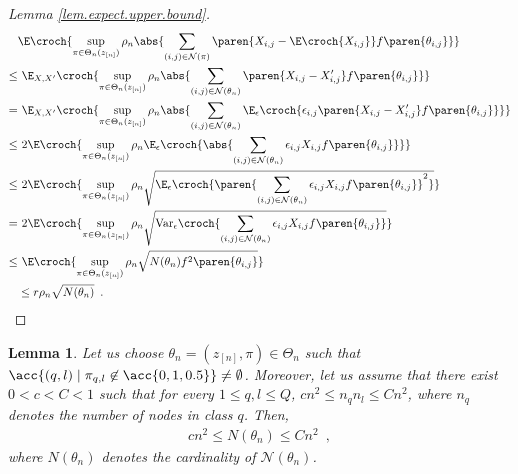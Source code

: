 \documentclass[11pt]{article}
\newtheorem{proof}{Proof}%
\newtheorem{lem}[thm]{Lemma}
\newcommand{\zn}{z_{[n]}}
\begin{document}
\begin{proof}[Lemma \ref{lem.expect.upper.bound}]
                \begin{align*}
& \E\croch{\sup_{\pi\in\Theta_n(\zn)}\rho_n\abs{\sum_{(i,j)\in\mathcal{N}(\pi)}\paren{X_{i,j}-\E\croch{X_{i,j}}}f\paren{\theta_{i,j}}}} \\
\leq &
\ \E_{X,X'}\croch{\sup_{\pi\in\Theta_n(\zn)} \rho_n \abs{\sum_{(i,j)\in\mathcal{N}(\theta_n)}\paren{X_{i,j}-X'_{i,j}}f\paren{\theta_{i,j}}}}\\
 = & \  \E_{X,X'}\croch{\sup_{\pi\in\Theta_n(\zn)} \rho_n \abs{\sum_{(i,j)\in\mathcal{N}(\theta_n)}\E_{\epsilon}\croch{\epsilon_{i,j}\paren{X_{i,j}-X'_{i,j}}f\paren{\theta_{i,j}}}}}\\
 \leq &\   2\E\croch{\sup_{\pi\in\Theta_n(\zn)} \rho_n \E_{\epsilon}\croch{\abs{\sum_{(i,j)\in\mathcal{N}(\theta_n)}\epsilon_{i,j}X_{i,j}f\paren{\theta_{i,j}}}}}\\
 \leq & \  2\E\croch{\sup_{\pi\in\Theta_n(\zn)} \rho_n \sqrt{\E_{\epsilon}\croch{\paren{\sum_{(i,j)\in\mathcal{N}(\theta_n)}\epsilon_{i,j}X_{i,j}f\paren{\theta_{i,j}}}^2}}}\\
= &\  2\E\croch{\sup_{\pi\in\Theta_n(\zn)} \rho_n \sqrt{\mathrm{Var}_{\epsilon}\croch{\sum_{(i,j)\in\mathcal{N}(\theta_n)}\epsilon_{i,j}X_{i,j}f\paren{\theta_{i,j}}}}}\\
\leq & \
 \E\croch{\sup_{\pi\in\Theta_n(\zn)} \rho_n \sqrt{N(\theta_n) f^2\paren{\theta_{i,j}}}}\\
& \leq r \rho_n\sqrt{N(\theta_n)}\enspace.
\end{align*}

\end{proof}







\begin{lem}\label{lem.card.non.nul.pi}
Let us choose $\theta_n=(\zn,\pi)\in\Theta_n$ such that
$\acc{(q,l)\mid \pi_{q,l}\not\in\acc{0,1,0.5}}\neq \emptyset$.
%
Moreover, let us assume that there exist $0< c < C <1$ such that for every $1\leq q,l\leq Q$,
$ c n^2\leq n_q n_l \leq C n^2$, where $n_q$ denotes the number of nodes in class $q$.
%
Then,
\begin{align*}
        c n^2 \leq N(\theta_n) \leq C n^2\enspace,
\end{align*}
where $N(\theta_n)$ denotes the cardinality of $\mathcal{N}(\theta_n)$.
\end{lem}
\end{document}
